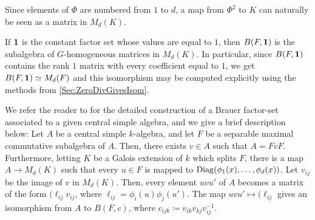 \begin{example}\label{ex:ConstantFS}
    Since elements of \(\Phi\) are numbered from \(1\) to \(d\), a map from \(\Phi^2\) to \(K\) can naturally be seen as a matrix in \(M_d(K)\).

    If \(\mathbf{1}\) is the constant factor set whose values are equal to \(1\), then \(B(F,\mathbf{1})\) is the subalgebra of \(G\)-homogeneous matrices in \(M_d(K)\). In particular, since \(B(F,\mathbf{1})\) contains the rank \(1\) matrix with every coefficient equal to \(1\), we get \(B(F,\mathbf{1}) \simeq M_d(F)\) and this isomorphism may be computed explicitly using the methods from \cref{Sec:ZeroDivGivesIsom}.
\end{example}

We refer the reader to \cite[Section 2.3]{jacobson2009finite} for the detailed construction of a Brauer factor-set associated to a given central simple algebra, and we give a brief description below:
Let \(A\) be a central simple \(k\)-algebra, and let \(F\) be a separable maximal commutative subalgebra of \(A\). Then, there exists \(v \in A\) such that \(A = FvF\). Furthermore, letting \(K\) be a Galois extension of \(k\) which splits \(F\), there is a map \(A \to M_d(K)\) such that every \(u \in F\) is mapped to \(\operatorname{Diag}(\phi_1(x),\hdots,\phi_d(x))\). Let \(v_{ij}\) be the image of \(v\) in \(M_d(K)\). Then, every element \(uvu'\) of \(A\) becomes a matrix of the form \((\ell_{ij} v_{ij}\), where \(\ell_{ij} = \phi_i(u)\phi_j(u')\). The map \(uvu' \mapsto (\ell_{ij}\) gives an isomorphism from \(A\) to \(B(F,c)\), where \(c_{ijk} \coloneqq v_{ik}v_{kj}v_{ij}^{-1}\).